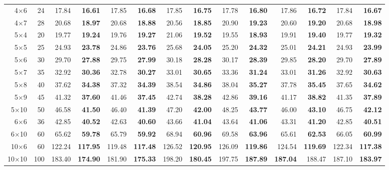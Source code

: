 \begin{table}[t]
\begin{tabular}{rrrrrrrrrrrrrr}
4$\times$6 & 24 & 17.84 & \textbf{16.61} & 17.85 & \textbf{16.68} & 17.85 & \textbf{16.75} & 17.78 & \textbf{16.80} & 17.86 & \textbf{16.72} & 17.84 & \textbf{16.67} \\
4$\times$7 & 28 & 20.68 & \textbf{18.97} & 20.68 & \textbf{18.88} & 20.56 & \textbf{18.85} & 20.90 & \textbf{19.23} & 20.60 & \textbf{19.20} & 20.68 & \textbf{18.98} \\
5$\times$4 & 20 & 19.77 & \textbf{19.24} & 19.76 & \textbf{19.27} & 21.06 & \textbf{19.52} & 19.55 & \textbf{18.93} & 19.91 & \textbf{19.40} & 19.77 & \textbf{19.32} \\
5$\times$5 & 25 & 24.93 & \textbf{23.78} & 24.86 & \textbf{23.76} & 25.68 & \textbf{24.05} & 25.20 & \textbf{24.32} & 25.01 & \textbf{24.21} & 24.93 & \textbf{23.99} \\
5$\times$6 & 30 & 29.70 & \textbf{27.88} & 29.75 & \textbf{27.99} & 30.18 & \textbf{28.28} & 30.17 & \textbf{28.39} & 29.85 & \textbf{28.20} & 29.70 & \textbf{27.89} \\
5$\times$7 & 35 & 32.92 & \textbf{30.36} & 32.78 & \textbf{30.27} & 33.01 & \textbf{30.65} & 33.36 & \textbf{31.24} & 33.01 & \textbf{31.26} & 32.92 & \textbf{30.63} \\
5$\times$8 & 40 & 37.62 & \textbf{34.38} & 37.32 & \textbf{34.39} & 38.54 & \textbf{34.86} & 38.04 & \textbf{35.27} & 37.78 & \textbf{35.45} & 37.65 & \textbf{34.62} \\
5$\times$9 & 45 & 41.32 & \textbf{37.60} & 41.46 & \textbf{37.45} & 42.74 & \textbf{38.28} & 42.86 & \textbf{39.16} & 41.17 & \textbf{38.82} & 41.35 & \textbf{37.89} \\
5$\times$10 & 50 & 46.58 & \textbf{41.50} & 46.40 & \textbf{41.39} & 47.20 & \textbf{42.00} & 48.25 & \textbf{43.77} & 46.00 & \textbf{43.10} & 46.75 & \textbf{42.12} \\
6$\times$6 & 36 & 42.85 & \textbf{40.52} & 42.63 & \textbf{40.60} & 43.66 & \textbf{41.04} & 43.64 & \textbf{41.06} & 43.31 & \textbf{41.20} & 42.85 & \textbf{40.51} \\
6$\times$10 & 60 & 65.62 & \textbf{59.78} & 65.79 & \textbf{59.92} & 68.94 & \textbf{60.96} & 69.58 & \textbf{63.96} & 65.61 & \textbf{62.53} & 66.05 & \textbf{60.99} \\
10$\times$6 & 60 & 122.24 & \textbf{117.95} & 119.48 & \textbf{117.48} & 126.52 & \textbf{120.95} & 126.09 & \textbf{119.86} & 124.54 & \textbf{119.69} & 122.34 & \textbf{117.38} \\
10$\times$10 & 100 & 183.40 & \textbf{174.90} & 181.90 & \textbf{175.33} & 198.20 & \textbf{180.45} & 197.75 & \textbf{187.89} & \textbf{187.04} & 188.47 & 187.10 & \textbf{183.97} \\
\bottomrule
\end{tabular}
\end{table}